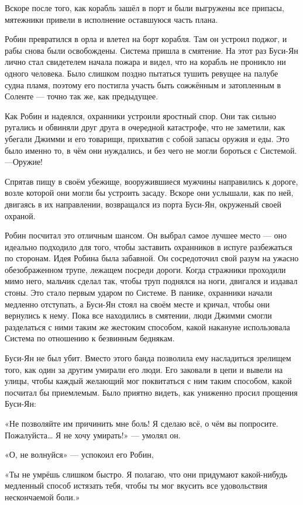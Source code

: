 \documentclass[a5paper, 9pt,
final, openany, twoside=true]{memoir}
\begin{document}
Вскоре после того, как корабль зашёл в порт и были выгружены все припасы, мятежники привели в исполнение оставшуюся часть плана.\bigskip

Робин превратился в орла и влетел на борт корабля. Там он устроил поджог, и рабы снова были освобождены. Система пришла в смятение. На этот раз Буси-Ян лично стал свидетелем начала пожара и видел, что на корабль не проникло ни одного человека. Было слишком поздно пытаться тушить ревущее на палубе судна пламя, поэтому его постигла участь быть сожжённым и затопленным в Соленте — точно так же, как предыдущее.

Как Робин и надеялся, охранники устроили яростный спор. Они так сильно ругались и обвиняли друг друга в очередной катастрофе, что не заметили, как убегали Джимми и его товарищи, прихватив с собой запасы оружия и еды. Это было именно то, в чём они нуждались, и без чего не могли бороться с Системой. —Оружие!

Спрятав пищу в своём убежище, вооружившиеся мужчины направились к дороге, возле которой они могли бы устроить засаду. Вскоре они услышали, как по ней, двигаясь в их направлении, возвращался из порта Буси-Ян, окруженый своей охраной.\bigskip

Робин посчитал это отличным шансом. Он выбрал самое лучшее место — оно идеально подходило для того, чтобы заставить охранников в испуге разбежаться по сторонам. Идея Робина была забавной. Он сосредоточил свой разум на ужасно обезображенном трупе, лежащем посреди дороги. Когда стражники проходили мимо него, мальчик сделал так, чтобы труп поднялся на ноги, двигался и издавал стоны. Это стало первым ударом по Системе. В панике, охранники начали медленно отступать, а Буси-Ян стоял на своём месте и кричал, чтобы они вернулись к нему. Пока все находились в смятении, люди Джимми смогли разделаться с ними таким же жестоким способом, какой накануне использовала Система по отношению к безвинным беднякам.

Буси-Ян не был убит. Вместо этого банда позволила ему насладиться зрелищем того, как один за другим умирали его люди. Его заковали в цепи и вывели на улицы, чтобы каждый желающий мог поквитаться с ним таким способом, какой посчитал бы приемлемым. Было приятно видеть, как униженно просил прощения Буси-Ян:

«Не позволяйте им причинить мне боль! Я сделаю всё, о чём вы попросите. Пожалуйста… Я не хочу умирать!» — умолял он.

«О, не волнуйся» — успокоил его Робин,

«Ты не умрёшь слишком быстро. Я полагаю, что они придумают какой-нибудь медленный способ истязать тебя, чтобы ты мог вкусить все удовольствия нескончаемой боли.»
\end{document}
